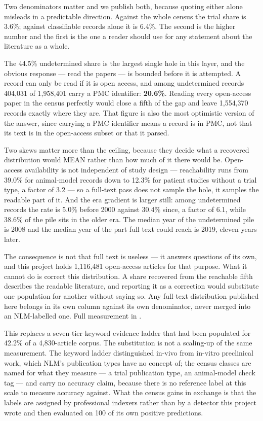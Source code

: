 \documentclass[11pt,twoside,openright]{report}
\begin{document}
Two denominators matter and we publish both, because quoting either alone misleads in a predictable direction. Against the whole census the trial share is 3.6\%; against classifiable records alone it is 6.4\%. The second is the higher number and the first is the one a reader should use for any statement about the literature as a whole.

The 44.5\% undetermined share is the largest single hole in this layer, and the obvious response --- read the papers --- is bounded before it is attempted. A record can only be read if it is open access, and among undetermined records 404,031 of 1,958,401 carry a PMC identifier: \textbf{20.6\%}. Reading every open-access paper in the census perfectly would close a fifth of the gap and leave 1,554,370 records exactly where they are. That figure is also the most optimistic version of the answer, since carrying a PMC identifier means a record is in PMC, not that its text is in the open-access subset or that it parsed.

Two skews matter more than the ceiling, because they decide what a recovered distribution would MEAN rather than how much of it there would be. Open-access availability is not independent of study design --- reachability runs from 39.0\% for animal-model records down to 12.3\% for patient studies without a trial type, a factor of 3.2 --- so a full-text pass does not sample the hole, it samples the readable part of it. And the era gradient is larger still: among undetermined records the rate is 5.0\% before 2000 against 30.4\% since, a factor of 6.1, while 38.6\% of the pile sits in the older era. The median year of the undetermined pile is 2008 and the median year of the part full text could reach is 2019, eleven years later.

The consequence is not that full text is useless --- it answers questions of its own, and this project holds 1,116,481 open-access articles for that purpose. What it cannot do is correct this distribution. A share recovered from the reachable fifth describes the readable literature, and reporting it as a correction would substitute one population for another without saying so. Any full-text distribution published here belongs in its own column against its own denominator, never merged into an NLM-labelled one. Full measurement in .

This replaces a seven-tier keyword evidence ladder that had been populated for 42.2\% of a 4,830-article corpus. The substitution is not a scaling-up of the same measurement. The keyword ladder distinguished in-vivo from in-vitro preclinical work, which NLM's publication types have no concept of; the census classes are named for what they measure --- a trial publication type, an animal-model check tag --- and carry no accuracy claim, because there is no reference label at this scale to measure accuracy against. What the census gains in exchange is that the labels are assigned by professional indexers rather than by a detector this project wrote and then evaluated on 100 of its own positive predictions.
\end{document}
